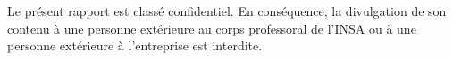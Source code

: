 Le présent rapport est classé confidentiel. En conséquence, la divulgation de son contenu à une personne extérieure au corps professoral de l’INSA ou à une personne extérieure à l’entreprise \aremplir{} est interdite.
\newpage